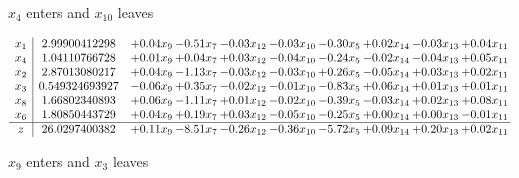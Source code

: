 \documentclass[9pt]{article}
\begin{document}
 $ x_{4} $ enters and $ x_{10} $ leaves 

 \[\begin{array}{c| c c@{\hskip 2pt} c@{\hskip 2pt} c@{\hskip 2pt} c@{\hskip 2pt} c@{\hskip 2pt} c@{\hskip 2pt} c@{\hskip 2pt} c@{\hskip 2pt} }
 x_{1}   &  2.99900412298 & +  0.04 x_{9} & -0.51 x_{7} & -0.03 x_{12} & -0.03 x_{10} & -0.30 x_{5} & +  0.02 x_{14} & -0.03 x_{13} & +  0.04 x_{11}\\
 x_{4}   &  1.04110766728 & +  0.01 x_{9} & +  0.04 x_{7} & +  0.03 x_{12} & -0.04 x_{10} & -0.24 x_{5} & -0.02 x_{14} & -0.04 x_{13} & +  0.05 x_{11}\\
 x_{2}   &  2.87013080217 & +  0.04 x_{9} & -1.13 x_{7} & -0.03 x_{12} & -0.03 x_{10} & +  0.26 x_{5} & -0.05 x_{14} & +  0.03 x_{13} & +  0.02 x_{11}\\
 x_{3}   &  0.549324693927 & -0.06 x_{9} & +  0.35 x_{7} & -0.02 x_{12} & -0.01 x_{10} & -0.83 x_{5} & +  0.06 x_{14} & +  0.01 x_{13} & +  0.01 x_{11}\\
 x_{8}   &  1.66802340893 & +  0.06 x_{9} & -1.11 x_{7} & +  0.01 x_{12} & -0.02 x_{10} & -0.39 x_{5} & -0.03 x_{14} & +  0.02 x_{13} & +  0.08 x_{11}\\
 x_{6}   &  1.80850443729 & +  0.04 x_{9} & +  0.19 x_{7} & +  0.03 x_{12} & -0.05 x_{10} & -0.25 x_{5} & +  0.00 x_{14} & +  0.00 x_{13} & -0.01 x_{11}\\
\hline
z    &  26.0297400382 & +  0.11 x_{9} & -8.51 x_{7} & -0.26 x_{12} & -0.36 x_{10} & -5.72 x_{5} & +  0.09 x_{14} & +  0.20 x_{13} & +  0.02 x_{11}\\
\end{array}\]


 $ x_{9} $ enters and $ x_{3} $ leaves 
\end{document}
